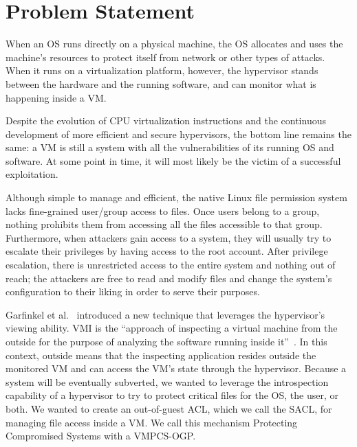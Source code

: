 \section{Problem Statement}\label{sec:problem} 
When an \ac{OS} runs directly on a physical machine, the \ac{OS} allocates and uses the machine's resources to protect itself from network or other types of attacks. When it runs on a virtualization platform, however, the hypervisor stands between the hardware and the running software, and can monitor what is happening inside a \ac{VM}. 

\par Despite the evolution of \ac{CPU} virtualization instructions and the continuous development of more efficient and secure hypervisors, the bottom line remains the same: a \ac{VM} is still a system with all the vulnerabilities of its running \ac{OS} and software. At some point in time, it will most likely be the victim of a successful exploitation. 

\par Although simple to manage and efficient, the native Linux file permission system lacks fine-grained user/group access to files. Once users belong to a group, nothing prohibits them from accessing all the files accessible to that group. Furthermore, when attackers gain access to a system, they will usually try to escalate their privileges by having access to the root account. After privilege escalation, there is unrestricted access to the entire system and nothing out of reach; the attackers are free to read and modify files and change the system's configuration to their liking in order to serve their purposes.

\par Garfinkel et al.~\cite{garfinkel2003virtual} introduced a new technique that leverages the hypervisor's viewing ability. \ac{VMI} is the “approach of inspecting a virtual machine from the outside for the purpose of analyzing the software running inside it”~\cite{garfinkel2003virtual}. In this context, outside means that the inspecting application resides outside the monitored \ac{VM} and can access the \ac{VM}'s state through the hypervisor. Because a system will be eventually subverted, we wanted to leverage the introspection capability of a hypervisor to try to protect critical files for the OS, the user, or both. We wanted to create an out-of-guest \ac{ACL}, which we call the \ac{SACL}, for managing file access inside a VM. We call this mechanism Protecting Compromised Systems with a \ac{VMPCS-OGP}.

